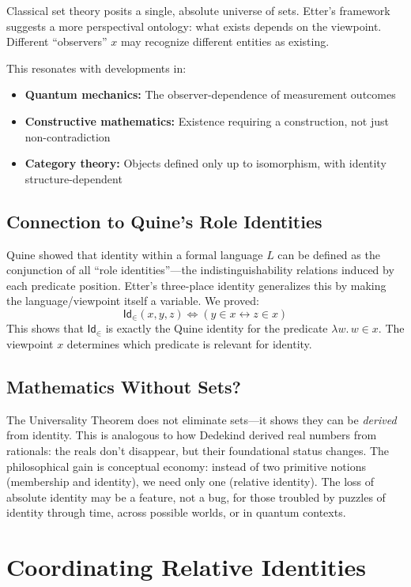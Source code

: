 \documentclass{ws-rv9x6}
\theoremstyle{remark}
\newcommand{\Id}{\mathsf{Id}}
\begin{document}
Classical set theory posits a single, absolute universe of sets. Etter's framework suggests a more perspectival ontology: what exists depends on the viewpoint. Different ``observers'' $x$ may recognize different entities as existing.

This resonates with developments in:
\begin{itemize}
    \item \textbf{Quantum mechanics:} The observer-dependence of measurement outcomes
    \item \textbf{Constructive mathematics:} Existence requiring a construction, not just non-contradiction
    \item \textbf{Category theory:} Objects defined only up to isomorphism, with identity structure-dependent
\end{itemize}

\subsection{Connection to Quine's Role Identities}

Quine showed that identity within a formal language $L$ can be defined as the conjunction of all ``role identities''---the indistinguishability relations induced by each predicate position. Etter's three-place identity generalizes this by making the language/viewpoint itself a variable. We proved:
\[
\Id_\in(x, y, z) \iff (y \in x \leftrightarrow z \in x)
\]
This shows that $\Id_\in$ is exactly the Quine identity for the predicate $\lambda w.\, w \in x$. The viewpoint $x$ determines which predicate is relevant for identity.

\subsection{Mathematics Without Sets?}

The Universality Theorem does not eliminate sets---it shows they can be \emph{derived} from identity. This is analogous to how Dedekind derived real numbers from rationals: the reals don't disappear, but their foundational status changes. The philosophical gain is conceptual economy: instead of two primitive notions (membership and identity), we need only one (relative identity). The loss of absolute identity may be a feature, not a bug, for those troubled by puzzles of identity through time, across possible worlds, or in quantum contexts.

\section{Coordinating Relative Identities}
\end{document}
